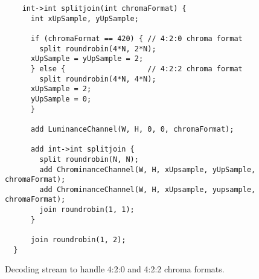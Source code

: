 \begin{figure*}[t]
  \begin{scriptsize}
    \begin{verbatim}
    int->int splitjoin(int chromaFormat) {
      int xUpSample, yUpSample;

      if (chromaFormat == 420) { // 4:2:0 chroma format
        split roundrobin(4*N, 2*N);
	  xUpSample = yUpSample = 2;
      } else {                   // 4:2:2 chroma format
        split roundrobin(4*N, 4*N);
	  xUpSample = 2;
	  yUpSample = 0;
      }

      add LuminanceChannel(W, H, 0, 0, chromaFormat);

      add int->int splitjoin {
        split roundrobin(N, N);
        add ChrominanceChannel(W, H, xUpsample, yUpSample, chromaFormat);
        add ChrominanceChannel(W, H, xUpsample, yupsample, chromaFormat);
        join roundrobin(1, 1);
      }

      join roundrobin(1, 2);
  }
  \end{verbatim}
  \end{scriptsize}
  \caption{Decoding stream to handle 4:2:0 and 4:2:2 chroma formats.}
  \label{fig:chroma-stream}
\end{figure*}



